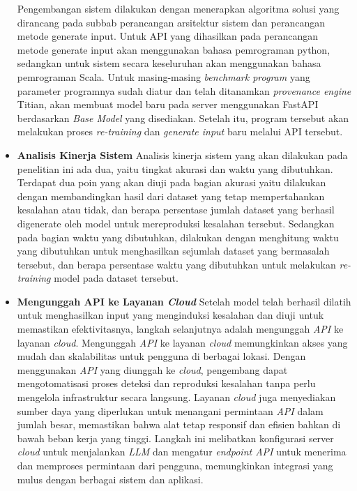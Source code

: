 \begin{itemize}[topsep=0pt]
  Pengembangan sistem dilakukan dengan menerapkan algoritma
  solusi yang dirancang pada subbab perancangan arsitektur
  sistem dan perancangan metode generate input. Untuk API
  yang dihasilkan pada perancangan metode generate input
  akan menggunakan bahasa pemrograman python, sedangkan
  untuk sistem secara keseluruhan akan menggunakan bahasa
  pemrograman Scala. Untuk masing-masing \emph{benchmark program}
  yang parameter programnya sudah diatur dan telah ditanamkan
  \emph{provenance engine} Titian, akan membuat model baru 
  pada server menggunakan FastAPI berdasarkan \emph{Base Model} 
  yang disediakan. Setelah itu, program tersebut akan melakukan 
  proses \emph{re-training} dan \emph{generate input} baru melalui 
  API tersebut.

  \item \textbf{Analisis Kinerja Sistem}
  Analisis kinerja sistem yang akan dilakukan pada penelitian 
  ini ada dua, yaitu tingkat akurasi dan waktu yang dibutuhkan. 
  Terdapat dua poin yang akan diuji pada bagian akurasi yaitu 
  dilakukan dengan membandingkan hasil dari dataset yang tetap 
  mempertahankan kesalahan atau tidak, dan berapa persentase
  jumlah dataset yang berhasil digenerate oleh model untuk
  mereproduksi kesalahan tersebut. Sedangkan pada bagian waktu
  yang dibutuhkan, dilakukan dengan menghitung waktu yang
  dibutuhkan untuk menghasilkan sejumlah dataset yang bermasalah 
  tersebut, dan berapa persentase waktu yang dibutuhkan untuk
  melakukan \emph{re-training} model pada dataset tersebut.

  \item \textbf{Mengunggah API ke Layanan \emph{Cloud}}
  Setelah model telah berhasil dilatih untuk menghasilkan 
  input yang menginduksi kesalahan dan diuji untuk memastikan 
  efektivitasnya, langkah selanjutnya adalah mengunggah 
  \emph{API} ke layanan \emph{cloud}. Mengunggah \emph{API} 
  ke layanan \emph{cloud} memungkinkan akses yang mudah dan 
  skalabilitas untuk pengguna di berbagai lokasi. Dengan 
  menggunakan \emph{API} yang diunggah ke \emph{cloud}, 
  pengembang dapat mengotomatisasi proses deteksi dan 
  reproduksi kesalahan tanpa perlu mengelola infrastruktur 
  secara langsung. Layanan \emph{cloud} juga menyediakan 
  sumber daya yang diperlukan untuk menangani permintaan 
  \emph{API} dalam jumlah besar, memastikan bahwa alat 
  tetap responsif dan efisien bahkan di bawah beban kerja 
  yang tinggi. Langkah ini melibatkan konfigurasi server 
  \emph{cloud} untuk menjalankan \emph{LLM} dan mengatur 
  \emph{endpoint API} untuk menerima dan memproses permintaan 
  dari pengguna, memungkinkan integrasi yang mulus dengan 
  berbagai sistem dan aplikasi.

\end{itemize}

